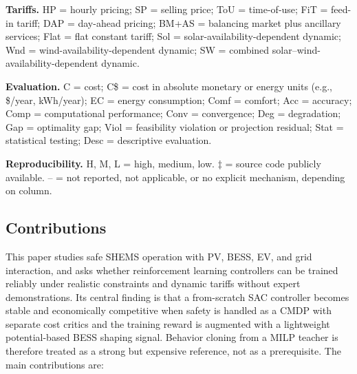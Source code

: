 \documentclass[preprint,12pt, 3p]{elsarticle}
\begin{document}
\begin{table}[t]
\begin{minipage}{0.98\textwidth}
\textbf{Tariffs.} HP = hourly pricing; SP = selling price; ToU = time-of-use; FiT = feed-in tariff; DAP = day-ahead pricing; BM+AS = balancing market plus ancillary services; Flat = flat constant tariff; Sol = solar-availability-dependent dynamic; Wnd = wind-availability-dependent dynamic; SW = combined solar--wind-availability-dependent dynamic.

\textbf{Evaluation.} C = cost; C\$ = cost in absolute monetary or energy units (e.g., \$/year, kWh/year); EC = energy consumption; Comf = comfort; Acc = accuracy; Comp = computational performance; Conv = convergence; Deg = degradation; Gap = optimality gap; Viol = feasibility violation or projection residual; Stat = statistical testing; Desc = descriptive evaluation.

\textbf{Reproducibility.} H, M, L = high, medium, low. $\ddagger$ = source code publicly available. -- = not reported, not applicable, or no explicit mechanism, depending on column.
\end{minipage}
\end{table}






\subsection{Contributions}

This paper studies safe \gls{SHEMS} operation with \gls{PV}, \gls{BESS}, \gls{EV}, and grid interaction, and asks whether reinforcement learning controllers can be trained reliably under realistic constraints and dynamic tariffs without expert demonstrations. Its central finding is that a from-scratch \gls{SAC} controller becomes stable and economically competitive when safety is handled as a \gls{CMDP} with separate cost critics and the training reward is augmented with a lightweight potential-based \gls{BESS} shaping signal. Behavior cloning from a \gls{MILP} teacher is therefore treated as a strong but expensive reference, not as a prerequisite. The main contributions are:
\end{document}
